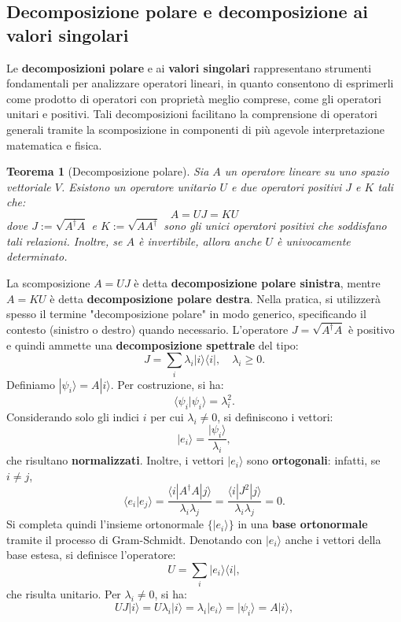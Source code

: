 \documentclass[a4paper,12pt]{report}
\theoremstyle{plain}
\newtheorem{theorem}{Teorema}[chapter]
\begin{document}
\subsection{Decomposizione polare e decomposizione ai valori singolari}
Le \textbf{decomposizioni polare} e ai \textbf{valori singolari} rappresentano strumenti fondamentali per analizzare operatori lineari, in quanto consentono di esprimerli come prodotto di operatori con proprietà meglio comprese, come gli operatori unitari e positivi. Tali decomposizioni facilitano la comprensione di operatori generali tramite la scomposizione in componenti di più agevole interpretazione matematica e fisica.
\begin{theorem}[Decomposizione polare]
Sia \( A \) un operatore lineare su uno spazio vettoriale \( V \). Esistono un operatore unitario \( U \) e due operatori positivi \( J \) e \( K \) tali che:
\[
A = UJ = KU
\]
dove \( J := \sqrt{A^\dagger A} \) e \( K := \sqrt{AA^\dagger} \) sono gli unici operatori positivi che soddisfano tali relazioni. Inoltre, se \( A \) è invertibile, allora anche \( U \) è univocamente determinato.
\end{theorem}
La scomposizione \( A = UJ \) è detta \textbf{decomposizione polare sinistra}, mentre \( A = KU \) è detta \textbf{decomposizione polare destra}. Nella pratica, si utilizzerà spesso il termine "decomposizione polare" in modo generico, specificando il contesto (sinistro o destro) quando necessario.
L'operatore \( J = \sqrt{A^\dagger A} \) è positivo e quindi ammette una \textbf{decomposizione spettrale} del tipo:
\[
J = \sum_i \lambda_i |i\rangle \langle i|, \quad \lambda_i \geq 0.
\]
Definiamo \(|\psi_i\rangle = A |i\rangle\). Per costruzione, si ha:
\[
\langle \psi_i |\psi_i\rangle = \lambda_i^2.
\]
Considerando solo gli indici \(i\) per cui \(\lambda_i \neq 0\), si definiscono i vettori:
\[
|e_i\rangle = \frac{|\psi_i\rangle}{\lambda_i},
\]
che risultano \textbf{normalizzati}. Inoltre, i vettori \(|e_i\rangle\) sono \textbf{ortogonali}: infatti, se \(i \neq j\),
\[
\langle e_i | e_j \rangle = \frac{\langle i | A^\dagger A |j\rangle}{\lambda_i \lambda_j} = \frac{\langle i | J^2 |j\rangle}{\lambda_i \lambda_j} = 0.
\]
Si completa quindi l'insieme ortonormale \(\{|e_i\rangle\}\) in una \textbf{base ortonormale} tramite il processo di Gram-Schmidt. Denotando con \(|e_i\rangle\) anche i vettori della base estesa, si definisce l'operatore:
\[
U = \sum_i |e_i\rangle \langle i|,
\]
che risulta unitario. Per \(\lambda_i \neq 0\), si ha:
\[
U J |i\rangle = U \lambda_i |i\rangle = \lambda_i |e_i\rangle = |\psi_i\rangle = A |i\rangle,
\]
\end{document}
